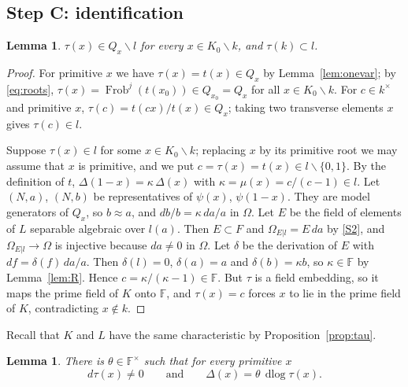 \documentclass[11pt]{amsart}
\newtheorem{lemma}[theorem]{Lemma}
\theoremstyle{definition}
\theoremstyle{remark}
\newcommand{\FF}{\mathbb{F}}
\newcommand{\Frob}{\operatorname{Frob}}
\newcommand{\dlog}{\operatorname{dlog}}
\newcommand{\sm}{\smallsetminus}
\begin{document}
\subsection{Step C: identification}

\begin{lemma}\label{lem:tauinQ}
$\tau(x)\in Q_x\sm l$ for every $x\in K_0\sm k$, and $\tau(k)\subset l$.
\end{lemma}

\begin{proof}
For primitive $x$ we have $\tau(x)=t(x)\in Q_x$ by Lemma~\ref{lem:onevar}; by \eqref{eq:roots}, $\tau(x)=\Frob^j(t(x_0))\in Q_{x_0}=Q_x$ for all $x\in K_0\sm k$.
For $c\in k^\times$ and primitive $x$, $\tau(c)=t(cx)/t(x)\in Q_x$; taking two transverse elements $x$ gives $\tau(c)\in l$.

Suppose $\tau(x)\in l$ for some $x\in K_0\sm k$; replacing $x$ by its primitive root we may assume that $x$ is primitive, and we put $c=\tau(x)=t(x)\in l\sm\{0,1\}$.
By the definition of $t$, $\Delta(1-x)=\kappa\,\Delta(x)$ with $\kappa=\mu(x)=c/(c-1)\in l$. Let $(N,a)$, $(N,b)$ be representatives of $\psi(x)$, $\psi(1-x)$. They are model generators of $Q_x$, so $b\approx a$, and $db/b=\kappa\,da/a$ in $\Omega$.
Let $E$ be the field of elements of $L$ separable algebraic over $l(a)$. Then $E\subset F$ and $\Omega_{E|l}=E\,da$ by \ref{S2}, and $\Omega_{E|l}\to\Omega$ is injective because $da\neq0$ in $\Omega$.
Let $\delta$ be the derivation of $E$ with $df=\delta(f)\,da/a$. Then $\delta(l)=0$, $\delta(a)=a$ and $\delta(b)=\kappa b$, so $\kappa\in\FF$ by Lemma~\ref{lem:R}.
Hence $c=\kappa/(\kappa-1)\in\FF$. But $\tau$ is a field embedding, so it maps the prime field of $K$ onto $\FF$, and $\tau(x)=c$ forces $x$ to lie in the prime field of $K$, contradicting $x\notin k$.
\end{proof}

Recall that $K$ and $L$ have the same characteristic by Proposition~\ref{prop:tau}.

\begin{lemma}\label{lem:theta}
There is $\theta\in\FF^\times$ such that for every primitive $x$
\[ d\tau(x)\neq0\qquad\text{and}\qquad \Delta(x)=\theta\,\dlog\tau(x). \]
\end{lemma}
\end{document}
